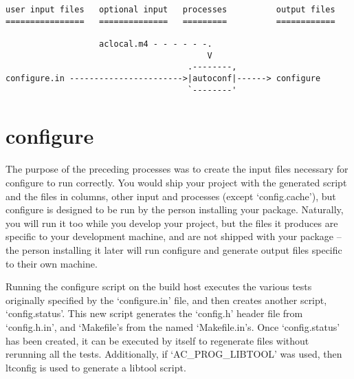  	

\begin{verbatim}
user input files   optional input   processes          output files
================   ==============   =========          ============

                   aclocal.m4 - - - - - -.
                                         V
                                     .--------,
configure.in ----------------------->|autoconf|------> configure
                                     `--------'

\end{verbatim}

\section{configure}

The purpose of the preceding processes was to create the input files necessary for configure to run correctly. You would ship your project with the generated script and the files in columns, other input and processes (except `config.cache'), but configure is designed to be run by the person installing your package. Naturally, you will run it too while you develop your project, but the files it produces are specific to your development machine, and are not shipped with your package -- the person installing it later will run configure and generate output files specific to their own machine.

Running the configure script on the build host executes the various tests originally specified by the `configure.in' file, and then creates another script, `config.status'. This new script generates the `config.h' header file from `config.h.in', and `Makefile's from the named `Makefile.in's. Once `config.status' has been created, it can be executed by itself to regenerate files without rerunning all the tests. Additionally, if `AC\_{}PROG\_{}LIBTOOL' was used, then ltconfig is used to generate a libtool script. 

\newpage 	

